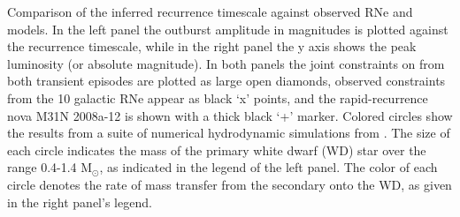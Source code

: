 \label{fig:RecurrentNovaRecurrenceComparison}
Comparison of the inferred \spock recurrence timescale against
observed RNe and models.  In the left panel the outburst amplitude in
magnitudes is plotted against the recurrence timescale, while in the
right panel the y axis shows the peak luminosity (or absolute
magnitude).  In both panels the joint constraints on \spock from both
transient episodes are plotted as large open diamonds, observed
constraints from the 10 galactic RNe appear as black `x' points, and
the rapid-recurrence nova M31N 2008a-12 is shown with a thick black
`+' marker.  Colored circles show the results from a suite of
numerical hydrodynamic simulations from \citet{Yaron:2005}.  The size
of each circle indicates the mass of the primary white dwarf (WD) star
over the range 0.4-1.4 M$_\odot$, as indicated in the legend of the
left panel.  The color of each circle denotes the rate of mass
transfer from the secondary onto the WD, as given in the right panel's
legend.

  
